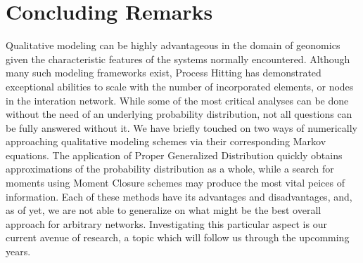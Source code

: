 \documentclass[en]{jdoc}
\begin{document}
\section{Concluding Remarks}
Qualitative modeling can be highly advantageous in the domain of geonomics given the characteristic features of the systems normally encountered. Although many such modeling frameworks exist, Process Hitting has demonstrated exceptional abilities to scale with the number of incorporated elements, or nodes in the interation network. While some of the most critical analyses can be done without the need of an underlying probability distribution, not all questions can be fully answered without it. We have briefly touched on two ways of numerically approaching qualitative modeling schemes via their corresponding Markov equations. The application of Proper Generalized Distribution quickly obtains approximations of the probability distribution as a whole, while a search for moments using Moment Closure schemes may produce the most vital peices of information. Each of these methods have its advantages and disadvantages, and, as of yet, we are not able to generalize on what might be the best overall approach for arbitrary networks. Investigating this particular aspect is our current avenue of research, a topic which will follow us through the upcomming years.

\end{document}
